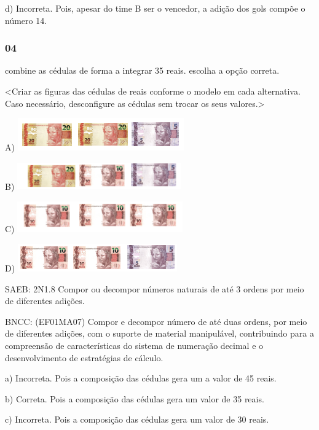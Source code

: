 d) Incorreta. Pois, apesar do time B ser o vencedor, a adição dos gols
compõe o número 14.

\subsubsection{04}\label{section-120}

combine as cédulas de forma a integrar 35 reais. escolha a opção
correta.

\textless{}Criar as figuras das cédulas de reais conforme o modelo em
cada alternativa. Caso necessário, desconfigure as cédulas sem trocar os
seus valores.\textgreater{}

A)
\includegraphics[width=2.81289in,height=0.55216in]{media/image140.png}

B)
\includegraphics[width=2.78164in,height=0.46882in]{media/image142.png}

C)
\includegraphics[width=2.80247in,height=0.53132in]{media/image144.png}

D)
\includegraphics[width=2.69829in,height=0.46882in]{media/image145.png}

SAEB: 2N1.8 Compor ou decompor números naturais de até 3 ordens por meio
de diferentes adições.

BNCC: (EF01MA07) Compor e decompor número de até duas ordens, por meio
de diferentes adições, com o suporte de material manipulável,
contribuindo para a compreensão de características do sistema de
numeração decimal e o desenvolvimento de estratégias de cálculo.

a) Incorreta. Pois a composição das cédulas gera um a valor de 45 reais.

b) Correta. Pois a composição das cédulas gera um valor de 35 reais.

c) Incorreta. Pois a composição das cédulas gera um valor de 30 reais.

